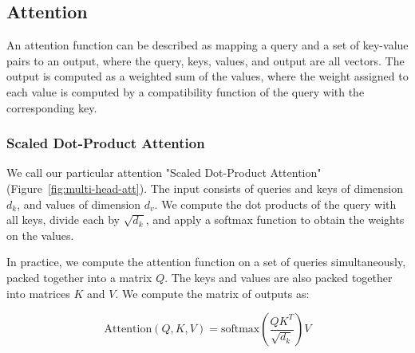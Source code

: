 \documentclass{article}
\begin{document}

\subsection{Attention} \label{sec:attention}
An attention function can be described as mapping a query and a set of key-value pairs to an output, where the query, keys, values, and output are all vectors.  The output is computed as a weighted sum of the values, where the weight assigned to each value is computed by a compatibility function of the query with the corresponding key.

\subsubsection{Scaled Dot-Product Attention} \label{sec:scaled-dot-prod}


We call our particular attention "Scaled Dot-Product Attention" (Figure~\ref{fig:multi-head-att}).   The input consists of queries and keys of dimension $d_k$, and values of dimension $d_v$.  We compute the dot products of the query with all keys, divide each by $\sqrt{d_k}$, and apply a softmax function to obtain the weights on the values.

In practice, we compute the attention function on a set of queries simultaneously, packed together into a matrix $Q$.   The keys and values are also packed together into matrices $K$ and $V$.  We compute the matrix of outputs as:

\begin{equation}
   \mathrm{Attention}(Q, K, V) = \mathrm{softmax}(\frac{QK^T}{\sqrt{d_k}})V
\end{equation}
\end{document}
